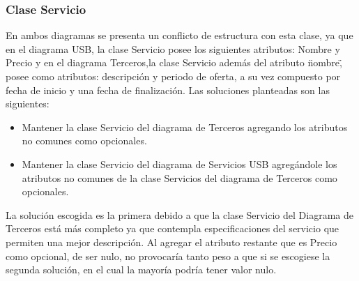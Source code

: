 \documentclass[12pt,a4paper,spanish]{article}
\begin{document}
\subsubsection{Clase Servicio}
\indent En ambos diagramas se presenta un conflicto de estructura con esta clase, ya que en el diagrama USB, la clase Servicio posee los siguientes atributos: Nombre y Precio y en el diagrama Terceros,la clase Servicio adem\'as del atributo \"nombre\", posee como atributos: descripci\'on y periodo de oferta, a su vez compuesto por fecha de inicio y una fecha de finalizaci\'on.
\newline
\newline
\indent Las soluciones planteadas son las siguientes:
\begin{itemize}
\item Mantener la clase Servicio del diagrama de Terceros agregando los atributos no comunes como opcionales.
\item Mantener la clase Servicio del diagrama de Servicios USB agreg\'andole los atributos no comunes de la clase Servicios del diagrama de Terceros como opcionales. 
\end{itemize}
\indent La soluci\'on escogida es la primera debido a que la clase Servicio del Diagrama de Terceros est\'a m\'as completo ya que contempla especificaciones del servicio que permiten una mejor descripci\'on. Al agregar el atributo restante que es Precio como opcional, de ser nulo, no provocar\'ia tanto peso a que si se escogiese la segunda soluci\'on, en el cual la mayor\'ia podr\'ia tener valor nulo.
\end{document}
